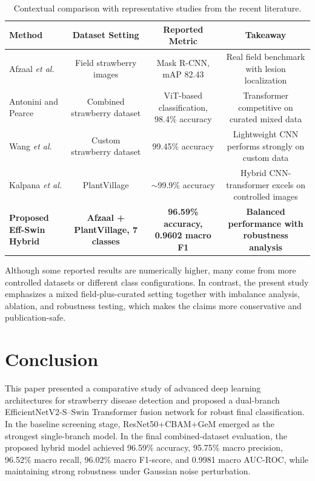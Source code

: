 \documentclass[conference]{IEEEtran}
\begin{document}
\begin{table}[htbp]
\caption{Contextual comparison with representative studies from the recent literature.}
\label{tab:literature_comparison}
\centering
\begin{tabular}{lccc}
\toprule
\textbf{Method} & \textbf{Dataset Setting} & \textbf{Reported Metric} & \textbf{Takeaway} \\
\midrule
Afzaal \textit{et al.} \cite{afzaal2021} & Field strawberry images & Mask R-CNN, mAP 82.43 & Real field benchmark with lesion localization \\
Antonini and Pearce \cite{antonini2024} & Combined strawberry dataset & ViT-based classification, 98.4\% accuracy & Transformer competitive on curated mixed data \\
Wang \textit{et al.} \cite{berrynet2024} & Custom strawberry dataset & 99.45\% accuracy & Lightweight CNN performs strongly on custom data \\
Kalpana \textit{et al.} \cite{kalpana2024} & PlantVillage & $\sim$99.9\% accuracy & Hybrid CNN-transformer excels on controlled images \\
\textbf{Proposed Eff-Swin Hybrid} & \textbf{Afzaal + PlantVillage, 7 classes} & \textbf{96.59\% accuracy, 0.9602 macro F1} & \textbf{Balanced performance with robustness analysis} \\
\bottomrule
\end{tabular}
\end{table}

Although some reported results are numerically higher, many come from more controlled datasets or different class configurations. In contrast, the present study emphasizes a mixed field-plus-curated setting together with imbalance analysis, ablation, and robustness testing, which makes the claims more conservative and publication-safe.

\section{Conclusion}
This paper presented a comparative study of advanced deep learning architectures for strawberry disease detection and proposed a dual-branch EfficientNetV2-S--Swin Transformer fusion network for robust final classification. In the baseline screening stage, ResNet50+CBAM+GeM emerged as the strongest single-branch model. In the final combined-dataset evaluation, the proposed hybrid model achieved 96.59\% accuracy, 95.75\% macro precision, 96.52\% macro recall, 96.02\% macro F1-score, and 0.9981 macro AUC-ROC, while maintaining strong robustness under Gaussian noise perturbation.
\end{document}
